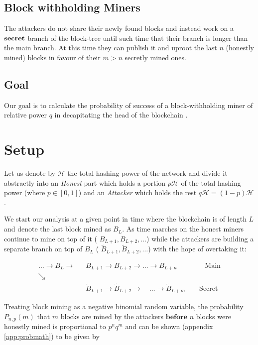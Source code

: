 \documentclass[letterpaper,12pt]{report}
\theoremstyle{plain}
\theoremstyle{definition}
\begin{document}
\subsection{Block withholding Miners}
The attackers do not share their newly found blocks and instead work on a $\bf{secret}$ branch of the block-tree until such time that their branch is longer than the main branch. At this time they can publish it and uproot the last $n$ (honestly mined) blocks in favour of their $m>n$ secretly mined ones.

\subsection{Goal}\label{subsec:goal}

Our goal is to calculate the probability of success of a block-withholding miner of relative power $q$ in decapitating the head of the blockchain .

\section{Setup}\label{calcsetup}
Let us denote by $\mathcal{H}$ the total hashing power of the network and divide it abstractly into an \emph{Honest} part which holds a portion $p\mathcal{H}$ of the total hashing power (where $p \in [0,1]$) and an \emph{Attacker} which holds the rest $q\mathcal{H}=(1-p)\mathcal{H}$. 

We start our analysis at a given point in time where the blockchain is of length $L$ and denote the last block mined as $\mathit{B}_L$. As time marches on the honest miners continue to mine on top of it ( $\mathit{B}_{L+1}, \mathit{B}_{L+2}, \dots$) while the attackers are building a separate branch on top of $\mathit{B}_L$ ( $\mathit{\tilde{B}}_{L+1}, \mathit{\tilde{B}}_{L+2}, \dots$) with the hope of overtaking it:

\begin{eqnarray}\label{blockwithholdingchain}
 \dots \rightarrow \mathit{B}_L\rightarrow &\mathit{B}_{L+1}\rightarrow\mathit{B}_{L+2}
\rightarrow\dots\rightarrow\mathit{B}_{L+n} \qquad\qquad \mathrm{Main}\\\nonumber
\searrow & \\\nonumber
\qquad \qquad \qquad & \widetilde{\mathit{B}}_{L+1}\rightarrow\widetilde{\mathit{B}}_{L+2}
\longrightarrow \quad \dots \longrightarrow\widetilde{\mathit{B}}_{L+m}\qquad \mathrm{Secret}
\end{eqnarray}

Treating block mining as a negative binomial random variable, the probability $\mathit{P_{n,p}(m)}$ that $m$ blocks are mined by the attackers $\mathbf{before}$ $n$ blocks were honestly mined is proportional to $p^nq^m$ and can be shown
(appendix \ref{app:probmath}) to be given by
\end{document}
